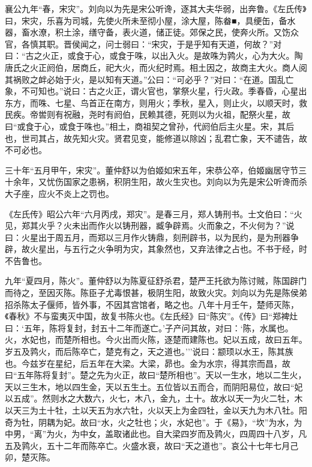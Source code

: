 \documentclass[]{article}
\begin{document}
襄公九年``春，宋灾''。刘向以为先是宋公听谗，逐其大夫华弱，出奔鲁。《左氏传》曰，宋灾，乐喜为司城，先使火所未至彻小屋，涂大屋，陈畚■，具绠缶，备水器，畜水潦，积土涂，缮守备，表火道，储正徒。郊保之民，使奔火所。又饬众官，各慎其职。晋侯闻之，问士弱曰：``宋灾，于是乎知有天道，何故？''对曰：``古之火正，或食于心，或食于咮，以出入火。是故咮为鹑火，心为大火。陶唐氏之火正阏伯，居商丘，祀大火，而火纪时焉。相土因之，故商主大火。商人阅其祸败之衅必始于火，是以知有天道。''公曰：``可必乎？''对曰：``在道。国乱亡象，不可知也。''说曰：古之火正，谓火官也，掌祭火星，行火政。季春昏，心星出东方，而咮、七星、鸟首正在南方，则用火；季秋，星入，则止火，以顺天时，救民疾。帝喾则有祝融，尧时有阏伯，民赖其德，死则以为火祖，配祭火星，故曰``或食于心，或食于咮也。''相土，商祖契之曾孙，代阏伯后主火星。宋，其后也，世司其占，故先知火灾。贤君见变，能修道以除凶；乱君亡象，天不谴告，故不可必也。

三十年``五月甲午，宋灾''。董仲舒以为伯姬如宋五年，宋恭公卒，伯姬幽居守节三十余年，又忧伤国家之患祸，积阴生阳，故火生灾也。刘向以为先是宋公听谗而杀大子座，应火不炎上之罚也。

《左氏传》昭公六年``六月丙戌，郑灾''。是春三月，郑人铸刑书。士文伯曰：``火见，郑其火乎？火未出而作火以铸刑器，臧争辟焉。火而象之，不火何为？''说曰：火星出于周五月，而郑以三月作火铸鼎，刻刑辟书，以为民约，是为刑器争辟，故火星出，与五行之火争明为灾，其象然也，又弃法律之占也。不书于经，时不告鲁也。

九年``夏四月，陈火''。董仲舒以为陈夏征舒杀君，楚严王托欲为陈讨贼，陈国辟门而待之，至因灭陈。陈臣子尤毒恨甚，极阴生阳，故致火灾。刘向以为先是陈侯弟招杀陈太子偃师，皆外事，不因其宫馆者，略之也。八年十月壬午，楚师灭陈，《春秋》不与蛮夷灭中国，故复书陈火也。《左氏经》曰``陈灾''。《传》曰``郑裨灶曰：`五年，陈将复封，封五十二年而遂亡。'子产问其故，对曰：`陈，水属也。火，水妃也，而楚所相也。今火出而火陈，逐楚而建陈也。妃以五成，故曰五年。岁五及鹑火，而后陈卒亡，楚克有之，天之道也。'''说曰：颛顼以水王，陈其族也。今兹岁在星纪，后五年在大梁。大梁，昴也。金为水宗，得其宗而昌，故曰``五年陈将复封''。楚之先为火正，故曰``楚所相也''。天以一生水，地以二生火，天以三生木，地以四生金，天以五生土。五位皆以五而合，而阴阳易位，故曰``妃以五成''。然则水之大数六，火七，木八，金九，土十。故水以天一为火二牡，木以天三为土十牡，土以天五为水六牡，火以天上为金四牡，金以天九为木八牡。阳奇为牡，阴耦为妃。故曰``水，火之牡也；火，水妃也''。于《易》，``坎''为水，为中男，``离''为火，为中女，盖取诸此也。自大梁四岁而及鹑火，四周四十八岁，凡五及鹑火，五十二年而陈卒亡。火盛水衰，故曰``天之道也''。哀公十七年七月己卯，楚灭陈。
\end{document}
